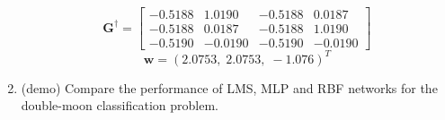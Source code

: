 \begin{enumerate}
\begin{solution}
    \begin{equation*}
      \mathbf{G}^\dagger=
      \left[
        \begin{array}{rrrr}
          -0.5188 & 1.0190 & -0.5188 &0.0187\\
          -0.5188 & 0.0187 & -0.5188 &1.0190\\
          -0.5190 & -0.0190 & -0.5190 &-0.0190
        \end{array}\right]
    \end{equation*}
    \begin{equation*}
      \mathbf{w}=(2.0753,\;2.0753,\;-1.076)^T
    \end{equation*}


  \end{solution}


\item (demo) Compare the performance of LMS, MLP and RBF networks for
  the double-moon classification problem.


\end{enumerate}
